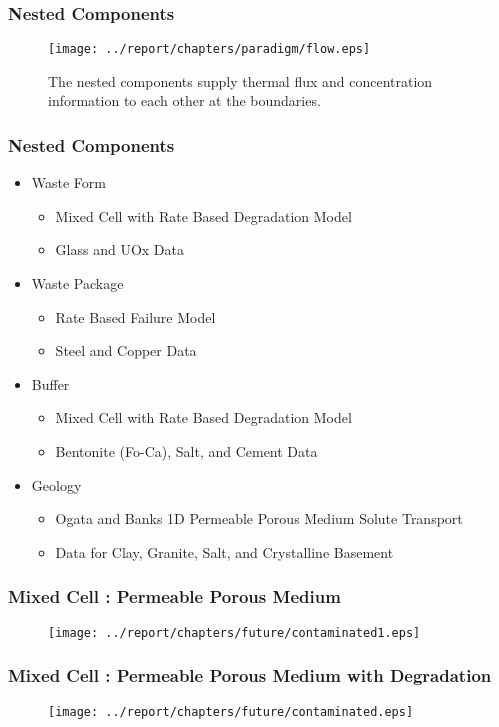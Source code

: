 

\begin{frame}[ctb!]
  \frametitle{Nested Components}
  \begin{figure}[h!]
    \begin{center}
      \texttt{[image: ../report/chapters/paradigm/flow.eps]}
    \end{center}
    \caption{The nested components supply thermal flux and concentration 
    information to each other at the boundaries.}
    \label{fig:flow}
  \end{figure}
\end{frame}

\begin{frame}
  \frametitle{Nested Components}
  \begin{itemize}
    \item Waste Form
      \begin{itemize}
        \item Mixed Cell with  Rate Based Degradation Model
        \item Glass and UOx Data
      \end{itemize}
    \item Waste Package
      \begin{itemize}
        \item Rate Based Failure Model
        \item Steel and Copper Data
      \end{itemize}
    \item Buffer
      \begin{itemize}
        \item Mixed Cell with  Rate Based Degradation Model
        \item Bentonite (Fo-Ca), Salt, and Cement Data
      \end{itemize}
    \item Geology
      \begin{itemize}
        \item Ogata and Banks 1D Permeable Porous Medium Solute Transport
        \item Data for Clay, Granite, Salt, and Crystalline Basement
      \end{itemize}
  \end{itemize}
\end{frame}


\begin{frame}[ctb!]
  \frametitle{Mixed Cell : Permeable Porous Medium}
  \begin{figure}[h!]
    \begin{center}
      \texttt{[image: ../report/chapters/future/contaminated1.eps]}
    \end{center}
  \end{figure}
\end{frame}

\begin{frame}[ctb!]
  \frametitle{Mixed Cell : Permeable Porous Medium with Degradation}
  \begin{figure}[h!]
    \begin{center}
      \texttt{[image: ../report/chapters/future/contaminated.eps]}
    \end{center}
  \end{figure}
\end{frame}


